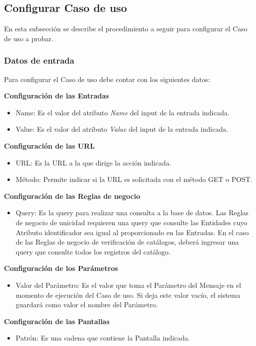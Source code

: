\subsection{Configurar Caso de uso}
En esta subsección se describe el procedimiento a seguir para configurar el Caso de uso a probar.

\subsubsection{Datos de entrada}
\begin{description}
	\item Para configurar el Caso de uso debe contar con los siguientes datos: \hspace{10pt}
	\begin{description}
	    \item \textbf{Configuración de las Entradas}
	    \begin{itemize}
		  \item Name: Es el valor del atributo \emph{Name} del input de la entrada indicada.
		  \item Value: Es el valor del atributo \emph{Value} del input de la entrada indicada.
	    \end{itemize}
	    \item \textbf{Configuración de las URL}
	    \begin{itemize}
		  \item URL: Es la URL a la que dirige la acción indicada.
		  \item Método: Permite indicar si la URL es solicitada con el método GET o POST.
	    \end{itemize}
	    \item \textbf{Configuración de las Reglas de negocio}
	    \begin{itemize}
		  \item Query: Es la query para realizar una consulta a la base de datos. Las Reglas de negocio de unicidad requieren una query que consulte las Entidades cuyo Atributo identificador sea igual al proporcionado en las Entradas. 
			En el caso de las Reglas de negocio de verificación de catálogos, deberá ingresar una query que consulte todos los registros del catálogo.
	    \end{itemize}
	    \item \textbf{Configuración de los Parámetros}
	    \begin{itemize}
		  \item Valor del Parámetro: Es el valor que toma el Parámetro del Mensaje en el momento de ejecución del Caso de uso. Si deja este valor vacío, el sistema guardará como valor el nombre del Parámetro.
	    \end{itemize}
	    \item \textbf{Configuración de las Pantallas}
	    \begin{itemize}
		  \item Patrón: Es una cadena que contiene la Pantalla indicada.
	    \end{itemize}
	 \end{description}
\end{description}


